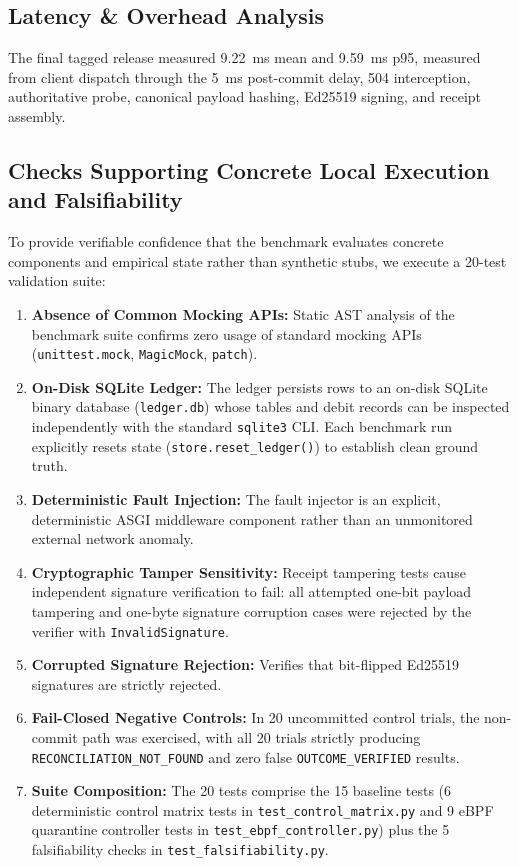 \documentclass[10pt,journal,compsoc]{IEEEtran}
\begin{document}
\subsection{Latency \& Overhead Analysis}
The final tagged release measured 9.22~ms mean and 9.59~ms p95, measured from client dispatch through the 5~ms post-commit delay, 504 interception, authoritative probe, canonical payload hashing, Ed25519 signing, and receipt assembly.

\subsection{Checks Supporting Concrete Local Execution and Falsifiability}
To provide verifiable confidence that the benchmark evaluates concrete components and empirical state rather than synthetic stubs, we execute a 20-test validation suite:
\begin{enumerate}
    \item \textbf{Absence of Common Mocking APIs:} Static AST analysis of the benchmark suite confirms zero usage of standard mocking APIs (\texttt{unittest.mock}, \texttt{MagicMock}, \texttt{patch}).
    \item \textbf{On-Disk SQLite Ledger:} The ledger persists rows to an on-disk SQLite binary database (\texttt{ledger.db}) whose tables and debit records can be inspected independently with the standard \texttt{sqlite3} CLI. Each benchmark run explicitly resets state (\texttt{store.reset\_ledger()}) to establish clean ground truth.
    \item \textbf{Deterministic Fault Injection:} The fault injector is an explicit, deterministic ASGI middleware component rather than an unmonitored external network anomaly.
    \item \textbf{Cryptographic Tamper Sensitivity:} Receipt tampering tests cause independent signature verification to fail: all attempted one-bit payload tampering and one-byte signature corruption cases were rejected by the verifier with \texttt{InvalidSignature}.
    \item \textbf{Corrupted Signature Rejection:} Verifies that bit-flipped Ed25519 signatures are strictly rejected.
    \item \textbf{Fail-Closed Negative Controls:} In 20 uncommitted control trials, the non-commit path was exercised, with all 20 trials strictly producing \texttt{RECONCILIATION\_NOT\_FOUND} and zero false \texttt{OUTCOME\_VERIFIED} results.
    \item \textbf{Suite Composition:} The 20 tests comprise the 15 baseline tests (6 deterministic control matrix tests in \texttt{test\_control\_matrix.py} and 9 eBPF quarantine controller tests in \texttt{test\_ebpf\_controller.py}) plus the 5 falsifiability checks in \texttt{test\_falsifiability.py}.
\end{enumerate}
\end{document}
